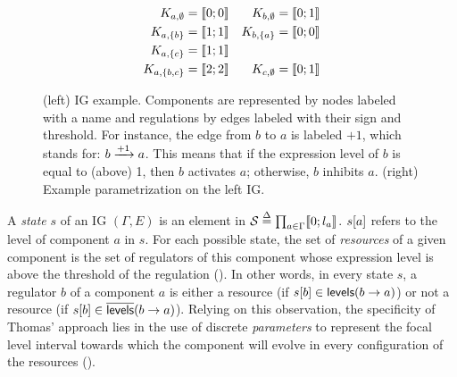 \begin{figure}[t]
\begin{minipage}{0.4\linewidth}
\centering
{}
\end{minipage}
\begin{minipage}{0.6\linewidth}
\centering
\begin{align*}
K_{a,\emptyset} &= \llbracket 0 ; 0 \rrbracket & K_{b,\emptyset} &= \llbracket 0 ; 1 \rrbracket \\
K_{a,\{b\}} &= \llbracket 1 ; 1 \rrbracket & K_{b,\{a\}} &= \llbracket 0 ; 0 \rrbracket \\
K_{a,\{c\}} &= \llbracket 1 ; 1 \rrbracket &&\\
K_{a,\{b,c\}} &= \llbracket 2 ; 2 \rrbracket & K_{c,\emptyset} &= \llbracket 0 ; 1 \rrbracket
\end{align*}
\end{minipage}
\caption{\label{fig:runningBRN}
(left)
IG example.
Components are represented by nodes labeled with a name
and regulations by edges labeled with their sign and threshold.
For instance, the edge from $b$ to $a$ is labeled $+1$, which stands for: $b \xrightarrow{+ 1} a$.
This means that if the expression level of $b$ is equal to (\ie above) 1, then $b$ activates $a$;
otherwise, $b$ inhibits $a$.
(right)
Example parametrization on the left IG.
}
\end{figure}

A \emph{state} $s$ of an IG $(\Gamma, E)$ is an element in $\mathcal{S} \stackrel{\Delta}= \prod_{a \in \Gamma} \llbracket 0 ; l_a \rrbracket$.
${s[a]}$ refers to the level of component $a$ in $s$.
For each possible state, the set of \emph{resources} of a given component
is the set of regulators of this component whose expression level is above the threshold of the regulation ().
In other words, in every state $s$, a regulator $b$ of a component $a$
is either a resource (if ${s[b]} \in \mathsf{levels}(b\rightarrow a)$)
or not a resource (if ${s[b]} \in \overline{\mathsf{levels}}(b\rightarrow a)$).
Relying on this observation, the specificity of Thomas' approach lies in the use of discrete \emph{parameters} to represent the
focal level interval towards which the component will evolve in every configuration of the resources ().

